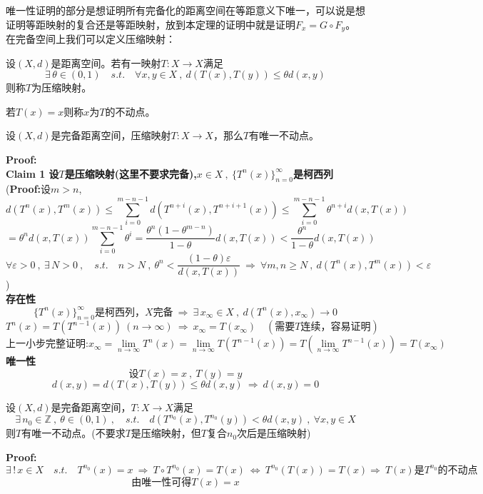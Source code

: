 唯一性证明的部分是想证明所有完备化的距离空间在等距意义下唯一，可以说是想证明等距映射的复合还是等距映射，放到本定理的证明中就是证明$F_x=G \circ F_y$。
\newpage
在完备空间上我们可以定义压缩映射：
\begin{definition}[压缩映射]
    设$(X,d)$是距离空间。若有一映射$T:X \to X$满足
    \[\exists \, \theta \in (0,1) \quad s.t. \quad \forall x,y \in X \ , \ d(T(x),T(y)) \leq \theta d(x,y)\]
    则称$T$为压缩映射。
\end{definition}
\begin{definition}[不动点]
    若$T(x)=x$则称$x$为$T$的不动点。
\end{definition}
\begin{theorem}[压缩映射原理]
    设$(X,d)$是完备距离空间，压缩映射$T:X \to X$，那么$T$有唯一不动点。
\end{theorem}
\textbf{Proof:}\\
\textbf{Claim 1 设$T$是压缩映射(这里不要求完备),$x \in X \ , \ \{T^n(x)\}_{n=0}^{\infty}$是柯西列}\\
(\textbf{Proof:}设$m>n$,
\[d(T^n(x),T^m(x)) \leq \sum_{i=0}^{m-n-1}d(T^{n+i}(x),T^{n+i+1}(x)) \leq \sum_{i=0}^{m-n-1}\theta^{n+i}d(x,T(x))\]
\[=\theta^nd(x,T(x))\sum_{i=0}^{m-n-1}\theta^i=\frac{\theta^n(1-\theta^{m-n})}{1-\theta}d(x,T(x)) < \frac{\theta^n}{1-\theta}d(x,T(x))\]
\[\forall \varepsilon>0 \ , \ \exists \, N>0 \ , \quad s.t. \quad n>N \ , \ \theta^n<\frac{(1-\theta)\varepsilon}{d(x,T(x))} \ \Rightarrow \ \forall m,n \geq N \ , \ d(T^n(x),T^m(x))<\varepsilon\]
)\\
\textbf{存在性}
\[\{T^n(x)\}_{n=0}^{\infty}\text{是柯西列，}X\text{完备} \ \Rightarrow \ \exists \, x_{\infty} \in X \ , \ d(T^n(x),x_{\infty}) \to 0\]
\[T^n(x)=T\left(T^{n-1}(x)\right) \ (n \to \infty) \ \Rightarrow \ x_{\infty}=T(x_{\infty}) \quad (\text{需要}T\text{连续，容易证明})\]
\[\text{上一小步完整证明:}x_{\infty}=\lim_{n \to \infty}T^n(x)=\lim_{n \to \infty}T(T^{n-1}(x))=T(\lim_{n \to \infty}T^{n-1}(x))=T(x_{\infty})\]
\textbf{唯一性}
\[\text{设}T(x)=x \ , \ T(y)=y\]
\[d(x,y)=d(T(x),T(y)) \leq \theta d(x,y) \ \Rightarrow \ d(x,y)=0\]
\begin{proposition}[推广的压缩映射原理]
    设$(X,d)$是完备距离空间，$T:X \to X$满足
    \[\exists \, n_0 \in \mathbb{Z} \ , \ \theta \in (0,1) \ , \quad s.t. \quad d(T^{n_0}(x),T^{n_0}(y))<\theta d(x,y) \ , \ \forall x,y \in X\]
    则$T$有唯一不动点。(不要求$T$是压缩映射，但$T$复合$n_0$次后是压缩映射)
\end{proposition}
\textbf{Proof:}
\[\exists \, ! \, x \in X \quad s.t. \quad T^{n_0}(x)=x \ \Rightarrow \ T \circ T^{n_0}(x)=T(x) \ \Leftrightarrow \ T^{n_0}(T(x))=T(x) \Rightarrow \ T(x)\text{是}T^{n_0}\text{的不动点}\]
\[\text{由唯一性可得}T(x)=x\]

